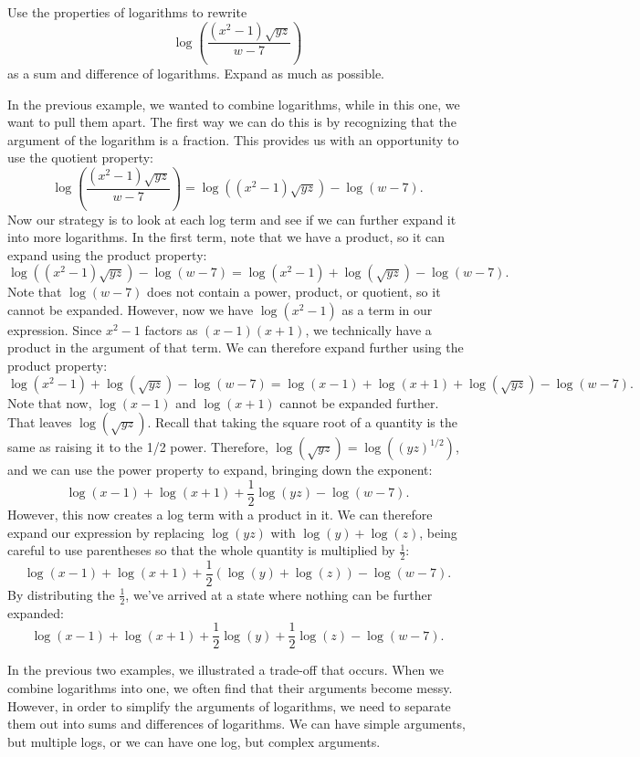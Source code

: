 \documentclass[nooutcomes]{ximera}
\begin{document}
\begin{example}
Use the properties of logarithms to rewrite 
$$
\log\left(\frac{(x^2 - 1)\sqrt{yz}}{w - 7}\right)
$$
as a sum and difference of logarithms. Expand as much as possible. 
\begin{explanation}
In the previous example, we wanted to combine logarithms, while in this one, we want to pull them apart. The first way we can do this is by recognizing that the argument of the logarithm is a fraction. This provides us with an opportunity to use the quotient property: 
$$
\log\left(\frac{(x^2 - 1)\sqrt{yz}}{w - 7}\right) = \log((x^2 - 1)\sqrt{yz}) - \log(w - 7). 
$$
Now our strategy is to look at each log term and see if we can further expand it into more logarithms. In the first term, note that we have a product, so it can expand using the product property:
$$
 \log((x^2 - 1)\sqrt{yz}) - \log(w - 7) = \log(x^2 - 1) + \log(\sqrt{yz}) - \log(w - 7). 
$$
Note that $\log(w - 7)$ does not contain a power, product, or quotient, so it cannot be expanded. However, now we have $\log(x^2 - 1)$ as a term in our expression. Since $x^2 - 1$ factors as $(x - 1)(x + 1)$, we technically have a product in the argument of that term. We can therefore expand further using the product property: 
$$
\log(x^2 - 1) + \log(\sqrt{yz}) - \log(w - 7) = \log(x - 1) + \log(x + 1) + \log(\sqrt{yz}) - \log(w - 7).
$$
Note that now, $\log(x - 1)$ and $\log(x + 1)$ cannot be expanded further. That leaves $\log(\sqrt{yz})$. Recall that taking the square root of a quantity is the same as raising it to the 1/2 power. Therefore, $\log(\sqrt{yz}) = \log((yz)^{1/2})$, and we can use the power property to expand, bringing down the exponent:
$$
\log(x - 1) + \log(x + 1) + \frac{1}{2}\log(yz) - \log(w - 7).
$$
However, this now creates a log term with a product in it. We can therefore expand our expression by replacing $\log(yz)$ with $\log(y) + \log(z)$, being careful to use parentheses so that the whole quantity is multiplied by $\frac{1}{2}$:
$$
\log(x - 1) + \log(x + 1) + \frac{1}{2}(\log(y) + \log(z))- \log(w - 7).
$$
By distributing the $\frac{1}{2}$, we've arrived at a state where nothing can be further expanded:
$$
\log(x - 1) + \log(x + 1) + \frac{1}{2}\log(y) + \frac{1}{2}\log(z)- \log(w - 7).
$$
\end{explanation}
\end{example}

In the previous two examples, we illustrated a trade-off that occurs. When we combine logarithms into one, we often find that their arguments become messy. However, in order to simplify the arguments of logarithms, we need to separate them out into sums and differences of logarithms. We can have simple arguments, but multiple logs, or we can have one log, but complex arguments. 
\end{document}

